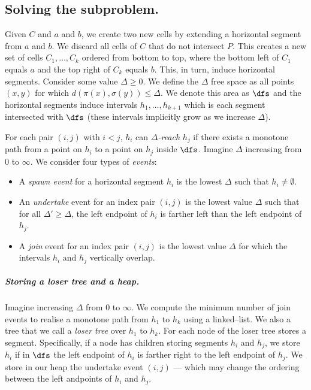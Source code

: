 \documentclass[english, thm-restate, notab]{lipics-v2021}
\begin{document}
\subsection{Solving the subproblem.}
Given $C$ and $a$ and $b$, we create two new cells by extending a horizontal segment from $a$ and $b$. We discard all cells of $C$ that do not intersect $P$. 
This creates a new set of cells $C_1, \ldots, C_k$ ordered from bottom to top, where the bottom left of $C_1$ equals $a$ and the top right of $C_k$ equals $b$. 
This, in turn,  induce horizontal segments. 
Consider some value $\Delta \geq 0$.
We define the $\Delta$ free space as all points $(x, y)$ for which $d(\pi(x), \sigma(y)) \leq \Delta$. We denote this area as $\dfs$ and the horizontal segments induce intervals  $h_1, \ldots, h_{k+1}$ which is each segment intersected with $\dfs$ (these intervals implicitly grow as we increase $\Delta$). 

For each pair $(i, j)$ with $i < j$, $h_i$ can \emph{$\Delta$-reach} $h_j$ if there exists a monotone path from a point on $h_i$ to a point on $h_j$ inside $\dfs$.
Imagine $\Delta$ increasing from $0$ to $\infty$.
We consider four types of \emph{events}:
\begin{itemize}
    \item A \emph{spawn event} for a horizontal segment $h_i$ is the lowest $\Delta$ such that $h_i \neq \emptyset$.
    \item An \emph{undertake} event for an index pair $(i, j)$ is the lowest value $\Delta$ such that for all $\Delta' \geq \Delta$, the left endpoint of $h_i$ is farther left than the left endpoint of $h_j$. 
    \item A \emph{join} event for an index pair $(i, j)$ is the lowest value $\Delta$ for which the intervals $h_i$ and $h_j$ vertically overlap. 
\end{itemize}



\subparagraph{Storing a loser tree and a heap.}
Imagine increasing $\Delta$ from $0$ to $\infty$. 
We compute the minimum number of join events to realise a monotone path from $h_1$ to $h_{k}$ using a linked–list.
We also a tree that we call a \emph{loser tree} over $h_1$ to $h_k$. 
For each node of the loser tree stores a segment.
Specifically, if a node has children storing segments $h_i$ and $h_j$, we store $h_i$ if in $\dfs$ the left endpoint of $h_i$ is farther right to the left endpoint of $h_j$. We store in our heap the undertake event $(i, j)$ --- which may change the ordering between the left andpoints of $h_i$ and $h_j$. 
\end{document}
